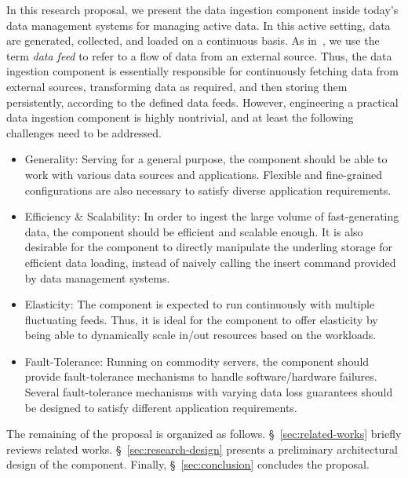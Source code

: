 \documentclass[conference]{llncs}
\newcommand{\refsection}[1]{\S~\ref{#1}}
\begin{document}
In this research proposal, we present the data ingestion component inside today's data management systems for managing active data.
In this active setting, data are generated, collected, and loaded on a continuous basis.
As in~\cite{ingestion2015}, we use the term \emph{data feed} to refer to a flow of data from an external source.
Thus, the data ingestion component is essentially responsible for continuously fetching data from external sources, transforming data as required, and then storing them persistently, according to the defined data feeds.
However, engineering a practical data ingestion component is highly nontrivial, and at least the following challenges need to be addressed.
\begin{itemize}
\item Generality: Serving for a general purpose, the component should be able to work with various data sources and applications.
Flexible and fine-grained configurations are also necessary to satisfy diverse application requirements.

\item Efficiency \& Scalability: In order to ingest the large volume of fast-generating data, the component should be efficient and scalable enough.
It is also desirable for the component to directly manipulate the underling storage for efficient data loading, instead of naively calling the insert command provided by data management systems.

\item Elasticity: The component is expected to run continuously with multiple fluctuating feeds. Thus, it is ideal for the component to offer elasticity by being able to dynamically scale in/out resources based on the workloads.

\item Fault-Tolerance: Running on commodity servers, the component should provide fault-tolerance mechanisms to handle software/hardware failures. Several fault-tolerance mechanisms with varying data loss guarantees should be designed to satisfy different application requirements.

\end{itemize}
The remaining of the proposal is organized as follows. \refsection{sec:related-works} briefly reviews related works.
\refsection{sec:research-design} presents a preliminary architectural design of the component.
Finally, \refsection{sec:conclusion} concludes the proposal.
\end{document}
